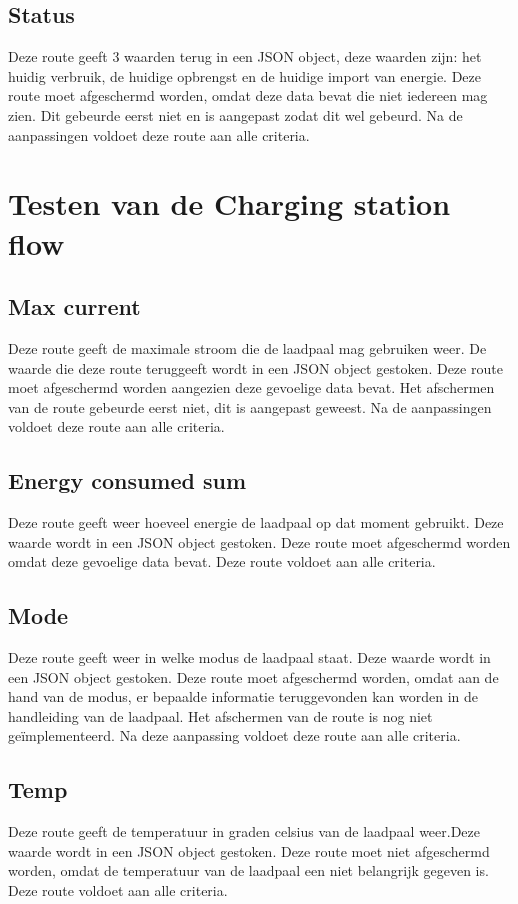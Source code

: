 \subsection{Status}
\label{subsec:testresultaten-elektriciteit-status}

Deze route geeft 3 waarden terug in een JSON object, deze waarden zijn: het huidig verbruik, de huidige opbrengst en de huidige import van energie. Deze route moet afgeschermd worden, omdat deze data bevat die niet iedereen mag zien. Dit gebeurde eerst niet en is aangepast zodat dit wel gebeurd. Na de aanpassingen voldoet deze route aan alle criteria.

\section{Testen van de Charging station flow}
\label{sec:testresultaten-charging-station}

\subsection{Max current}
\label{subsec:testresultaten-max-current}

Deze route geeft de maximale stroom die de laadpaal mag gebruiken weer. De waarde die deze route teruggeeft wordt in een JSON object gestoken. Deze route moet afgeschermd worden aangezien deze gevoelige data bevat. Het afschermen van de route gebeurde eerst niet, dit is aangepast geweest. Na de aanpassingen voldoet deze route aan alle criteria.

\subsection{Energy consumed sum}
\label{subsec:testresultaten-energy-consumed-sum}

Deze route geeft weer hoeveel energie de laadpaal op dat moment gebruikt. Deze waarde wordt in een JSON object gestoken. Deze route moet afgeschermd worden omdat deze gevoelige data bevat. Deze route voldoet aan alle criteria.

\subsection{Mode}
\label{subsec:testresultaten-mode}

Deze route geeft weer in welke modus de laadpaal staat. Deze waarde wordt in een JSON object gestoken. Deze route moet afgeschermd worden, omdat aan de hand van de modus, er bepaalde informatie teruggevonden kan worden in de handleiding van de laadpaal. Het afschermen van de route is nog niet geïmplementeerd. Na deze aanpassing voldoet deze route aan alle criteria.

\subsection{Temp}
\label{subsec:testresultaten-temp}

Deze route geeft de temperatuur in graden celsius van de laadpaal weer.Deze waarde wordt in een JSON object gestoken. Deze route moet niet afgeschermd worden, omdat de temperatuur van de laadpaal een niet belangrijk gegeven is. Deze route voldoet aan alle criteria.